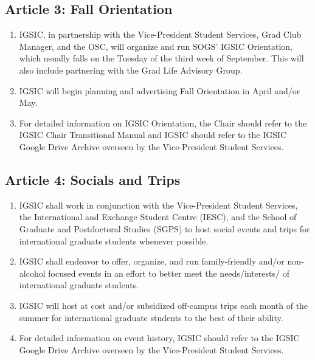 \subsection{Article 3: Fall Orientation}
\begin{enumerate}[label*=\arabic*., align=left]
\item IGSIC, in partnership with the Vice-President Student Services, Grad Club Manager, and the
OSC, will organize and run SOGS' IGSIC Orientation, which usually falls on the Tuesday of the third week of September. This will also include partnering with the Grad Life Advisory Group.
\item IGSIC will begin planning and advertising Fall Orientation in April and/or May.
\item For detailed information on IGSIC Orientation, the Chair should refer to the IGSIC Chair
Transitional Manual and IGSIC should refer to the IGSIC Google Drive Archive overseen by
the Vice-President Student Services.
\end{enumerate}

\subsection{Article 4: Socials and Trips}
\begin{enumerate}[label*=\arabic*., align=left]
\item IGSIC shall work in conjunction with the Vice-President Student Services, the International and Exchange Student Centre (IESC), and the School of Graduate and Postdoctoral Studies (SGPS) to host social events and trips for international graduate students whenever possible.
\item IGSIC shall endeavor to offer, organize, and run family-friendly and/or non-alcohol focused events in an effort to better meet the needs/interests/ of international graduate students.
\item IGSIC will host at cost and/or subsidized off-campus trips each month of the summer for international graduate students to the best of their ability.
\item For detailed information on event history, IGSIC should refer to the IGSIC Google Drive Archive overseen by the Vice-President Student Services.
\end{enumerate}

